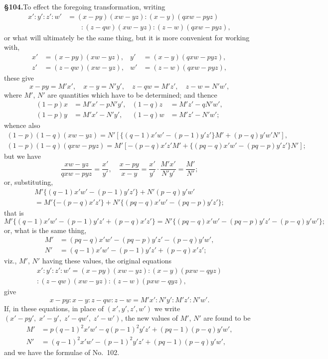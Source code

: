 \documentclass[11pt,a4paper]{article}
\begin{document}
\textbf{\S 104.}\quad To effect the foregoing transformation, writing
\begin{align*}
x' : y' : z' : w' &= (x - py)(xw - yz) : (x - y)(qxw - pyz) \\
&\qquad : (z - qw)(xw - yz) : (z - w)(qxw - pyz),
\end{align*}
or what will ultimately be the same thing, but it is more convenient for working with,
\begin{align*}
x' &= (x - py)(xw - yz), & y' &= (x - y)(qxw - pyz), \\
z' &= (z - qw)(xw - yz), & w' &= (z - w)(qxw - pyz),
\end{align*}
these give
\[
x - py = M'x',\quad x - y = N'y',\quad z - qw = M'z',\quad z - w = N'w',
\]
where $M'$, $N'$ are quantities which have to be determined; and thence
\begin{align*}
(1 - p)x &= M'x' - pN'y', & (1 - q)z &= M'z' - qN'w', \\
(1 - p)y &= M'x' - N'y', & (1 - q)w &= M'z' - N'w';
\end{align*}
whence also
\begin{multline*}
(1 - p)(1 - q)(xw - yz) = N'[\{(q - 1)x'w' - (p - 1)y'z'\}M' + (p - q)y'w'N'], \\
(1 - p)(1 - q)(qxw - pyz) = M'[-(p - q)x'z'M' + \{(pq - q)x'w' - (pq - p)y'z'\}N'];
\end{multline*}
but we have
\[
\frac{xw - yz}{qxw - pyz} = \frac{x'}{y'},\quad \frac{x - py}{x - y} = \frac{x'}{y'} \cdot \frac{M'x'}{N'y'} = \frac{M'}{N'};
\]
or, substituting,
\begin{multline*}
M'\{(q - 1)x'w' - (p - 1)y'z'\} + N'(p - q)y'w' \\
= M'\{-(p - q)x'z'\} + N'\{(pq - q)x'w' - (pq - p)y'z'\};
\end{multline*}
that is
\[
M'\{(q - 1)x'w' - (p - 1)y'z' + (p - q)x'z'\} = N'\{(pq - q)x'w' - (pq - p)y'z' - (p - q)y'w'\};
\]
or, what is the same thing,
\begin{align*}
M' &= (pq - q)x'w' - (pq - p)y'z' - (p - q)y'w', \\
N' &= (q - 1)x'w' - (p - 1)y'z' + (p - q)x'z';
\end{align*}
viz., $M'$, $N'$ having these values, the original equations
\begin{multline*}
x' : y' : z' : w' = (x - py)(xw - yz) : (x - y)(pxw - qyz) \\
: (z - qw)(xw - yz) : (z - w)(pxw - qyz),
\end{multline*}
give
\[
x - py : x - y : z - qw : z - w = M'x' : N'y' : M'z' : N'w'.
\]
If, in these equations, in place of $(x', y', z', w')$ we write $(x' - py',\; x' - y',\; z' - qw',\; z' - w')$, the new values of $M'$, $N'$ are found to be
\begin{align*}
M' &= p(q - 1)^2x'w' - q(p - 1)^2y'z' + (pq - 1)(p - q)y'w', \\
N' &= (q - 1)^2x'w' - (p - 1)^2y'z' + (pq - 1)(p - q)y'w',
\end{align*}
and we have the formulae of No.~102.
\end{document}
